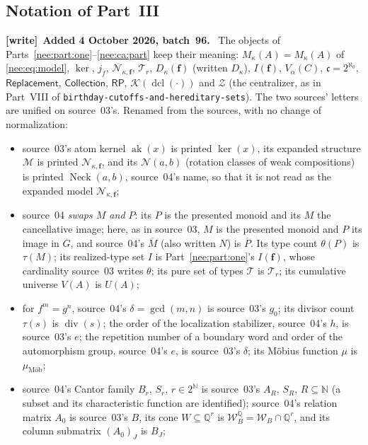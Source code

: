 \documentclass[11pt,letterpaper]{article}
\numberwithin{equation}{section}
\theoremstyle{plain}
\theoremstyle{definition}
\theoremstyle{remark}
\newcommand{\N}{\mathcal N_{\kappa,\boldsymbol f}}
\newcommand{\Rep}{\mathsf{Replacement}}
\newcommand{\Coll}{\mathsf{Collection}}
\newcommand{\RP}{\mathsf{RP}}
\newcommand{\kerat}{\operatorname{ker}}
\newcommand{\cont}{\mathfrak c}
\newcommand{\Mk}{M_\kappa(A)}
\newcommand{\NN}{\mathbb N}
\newcommand{\QQ}{\mathbb Q}
\newcommand{\dcl}{\operatorname{dcl}}
\newcommand{\Neck}{\operatorname{Neck}}
\newenvironment{writenote}[1][]{\par\smallskip\begingroup\small\raggedright
 \setlength{\parindent}{1.25em}\noindent\textbf{[write]}\if\relax\detokenize{#1}\relax\else~\textbf{#1.}\fi\ }%
 {\par\endgroup\smallskip}
\begin{document}
\subsection{Notation of Part~III}
\label{nee:aa:sec:notation}

\begin{writenote}[Added 4 October 2026, batch~96]
The objects of Parts~\ref{nee:part:one}--\ref{nee:ca:part} keep their meaning: $\Mk=M_\kappa(A)$ of \eqref{nee:eq:model}, $\kerat$, $j_f$, $\N$, $\mathcal T_r$, $D_\kappa(\boldsymbol f)$ (written $D_\kappa$), $I(\boldsymbol f)$, $V_\alpha(C)$, $\cont=2^{\aleph_0}$, $\Rep$, $\Coll$, $\RP$, $\mathcal K(\dcl(\cdot))$ and $\mathcal Z$ (the centralizer, as in Part~VIII of \nolinkurl{birthday-cutoffs-and-hereditary-sets}). The two sources' letters are unified on source~03's. Renamed from the sources, with no change of normalization:
\begin{itemize}
\item source~03's atom kernel $\operatorname{ak}(x)$ is printed $\kerat(x)$, its expanded structure $\mathcal M$ is printed $\N$, and its $\mathcal N(a,b)$ (rotation classes of weak compositions) is printed $\Neck(a,b)$, source~04's name, so that it is not read as the expanded model $\N$;
\item source~04 \emph{swaps $M$ and $P$}: its $P$ is the presented monoid and its $M$ the cancellative image; here, as in source~03, $M$ is the presented monoid and $P$ its image in $G$, and source~04's $\overline M$ (also written $N$) is $\overline P$. Its type count $\theta(P)$ is $\tau(M)$; its realized-type set $I$ is Part~\ref{nee:part:one}'s $I(\boldsymbol f)$, whose cardinality source~03 writes $\theta$; its pure set of types $\mathcal T$ is $\mathcal T_r$; its cumulative universe $V(A)$ is $U(A)$;
\item for $f^m=g^n$, source~04's $\delta=\gcd(m,n)$ is source~03's $g_0$; its divisor count $\tau(s)$ is $\operatorname{div}(s)$; the order of the localization stabilizer, source~04's $h$, is source~03's $e$; the repetition number of a boundary word and order of the automorphism group, source~04's $e$, is source~03's $\delta$; its M\"obius function $\mu$ is $\mu_{\text{M\"ob}}$;
\item source~04's Cantor family $B_r$, $S_r$, $r\in2^{\NN}$ is source~03's $A_R$, $S_R$, $R\subseteq\NN$ (a subset and its characteristic function are identified); source~04's relation matrix $A_0$ is source~03's $B$, its cone $W\subseteq\QQ^r$ is $\mathcal W_B^{\QQ}=\mathcal W_B\cap\QQ^r$, and its column submatrix $(A_0)_J$ is $B_J$;

\end{itemize}
\end{writenote}
\end{document}
